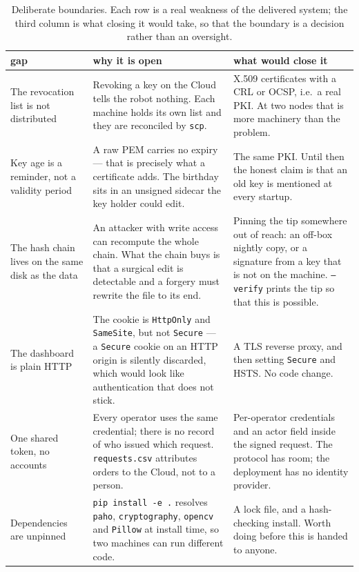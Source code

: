 \begin{table}[!t]
\caption{Deliberate boundaries. Each row is a real weakness of the
delivered system; the third column is what closing it would take, so
that the boundary is a decision rather than an oversight.}
\label{tab:notdone}
\centering\footnotesize
\renewcommand{\arraystretch}{1.25}
\begin{tabular}{@{}p{}p{}p{}@{}}
\toprule
gap & why it is open & what would close it \\
\midrule
The revocation list is not distributed &
Revoking a key on the Cloud tells the robot nothing. Each machine holds
its own list and they are reconciled by \texttt{scp}. &
X.509 certificates with a CRL or OCSP, i.e.\ a real PKI. At two nodes
that is more machinery than the problem. \\

Key age is a reminder, not a validity period &
A raw PEM carries no expiry --- that is precisely what a certificate
adds. The birthday sits in an unsigned sidecar the key holder could
edit. &
The same PKI. Until then the honest claim is that an old key is
mentioned at every startup. \\

The hash chain lives on the same disk as the data &
An attacker with write access can recompute the whole chain. What the
chain buys is that a surgical edit is detectable and a forgery must
rewrite the file to its end. &
Pinning the tip somewhere out of reach: an off-box nightly copy, or a
signature from a key that is not on the machine.
\texttt{--verify} prints the tip so that this is possible. \\

The dashboard is plain HTTP &
The cookie is \texttt{HttpOnly} and \texttt{SameSite}, but not
\texttt{Secure} --- a \texttt{Secure} cookie on an HTTP origin is
silently discarded, which would look like authentication that does not
stick. &
A TLS reverse proxy, and then setting \texttt{Secure} and HSTS. No code
change. \\

One shared token, no accounts &
Every operator uses the same credential; there is no record of who
issued which request. \texttt{requests.csv} attributes orders to the
Cloud, not to a person. &
Per-operator credentials and an actor field inside the signed request.
The protocol has room; the deployment has no identity provider. \\

Dependencies are unpinned &
\texttt{pip install -e .} resolves \texttt{paho}, \texttt{cryptography},
\texttt{opencv} and \texttt{Pillow} at install time, so two machines can
run different code. &
A lock file, and a hash-checking install. Worth doing before this is
handed to anyone. \\


\end{tabular}
\end{table}
